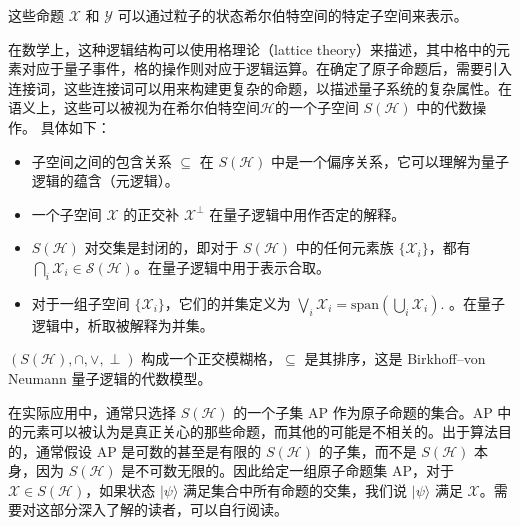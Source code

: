 这些命题 \( \mathcal{X} \) 和 \( \mathcal{Y} \) 可以通过粒子的状态希尔伯特空间的特定子空间来表示。

在数学上，这种逻辑结构可以使用格理论（lattice theory）来描述，其中格中的元素对应于量子事件，格的操作则对应于逻辑运算。在确定了原子命题后，需要引入连接词，这些连接词可以用来构建更复杂的命题，以描述量子系统的复杂属性。在语义上，这些可以被视为在希尔伯特空间$\mathcal{H}$的一个子空间 \(S(\mathcal{H})\) 中的代数操作。
具体如下：
\begin{itemize}
    \item 子空间之间的包含关系 \( \subseteq \) 在 \(S(\mathcal{H})\) 中是一个偏序关系，它可以理解为量子逻辑的蕴含（元逻辑）。
    \item 一个子空间 \( \mathcal{X} \) 的正交补 \( \mathcal{X}^\perp \) 在量子逻辑中用作否定的解释。
    \item \(S(\mathcal{H})\) 对交集是封闭的，即对于 \(S(\mathcal{H})\) 中的任何元素族 \( \{\mathcal{X}_i\} \)，都有$\bigcap_{i} \mathcal{X}_{i} \in \mathcal{S}(\mathcal{H})$。在量子逻辑中用于表示合取。
    \item 对于一组子空间 \(\{\mathcal{X}_i\}\)，它们的并集定义为
    \(
    \bigvee_i \mathcal{X}_i = \text{span} \left( \bigcup_i \mathcal{X}_i \right).
    \)
    。在量子逻辑中，析取被解释为并集。
\end{itemize}

\( (S(\mathcal{H}), \cap, \vee, \perp) \) 构成一个正交模糊格，\( \subseteq \) 是其排序，这是 Birkhoff–von Neumann 量子逻辑的代数模型。

在实际应用中，通常只选择 \( S(\mathcal{H}) \) 的一个子集 AP 作为原子命题的集合。AP 中的元素可以被认为是真正关心的那些命题，而其他的可能是不相关的。出于算法目的，通常假设 AP 是可数的甚至是有限的 \( S(\mathcal{H}) \) 的子集，而不是 \( S(\mathcal{H}) \) 本身，因为 \( S(\mathcal{H}) \) 是不可数无限的。因此给定一组原子命题集 AP，对于 \( \mathcal{X} \in S(\mathcal{H}) \)，如果状态 \(|\psi\rangle\) 满足集合中所有命题的交集，我们说 \(|\psi\rangle\) 满足 \(\mathcal{X}\)。需要对这部分深入了解的读者，可以自行阅读\citep{2021}。


